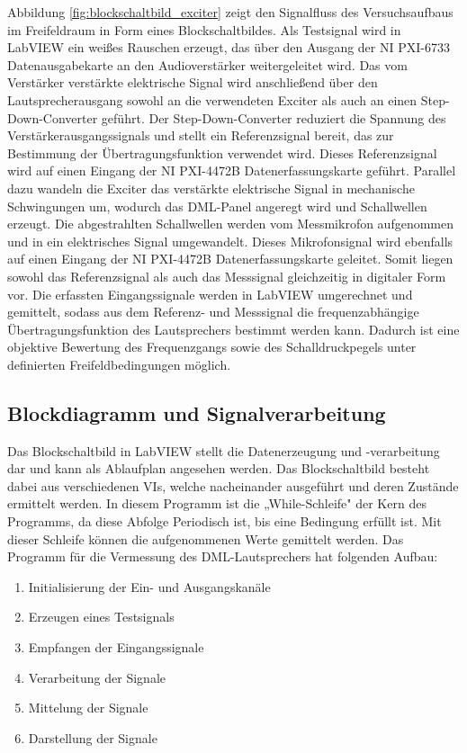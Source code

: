 Abbildung \ref{fig:blockschaltbild_exciter} zeigt den Signalfluss des Versuchsaufbaus im Freifeldraum in Form eines Blockschaltbildes. Als Testsignal wird in LabVIEW ein weißes Rauschen erzeugt, das über den Ausgang der NI PXI-6733 Datenausgabekarte an den Audioverstärker weitergeleitet wird. Das vom Verstärker verstärkte elektrische Signal wird anschließend über den Lautsprecherausgang sowohl an die verwendeten Exciter als auch an einen Step-Down-Converter geführt.
Der Step-Down-Converter reduziert die Spannung des Verstärkerausgangssignals und stellt ein Referenzsignal bereit, das zur Bestimmung der Übertragungsfunktion verwendet wird. Dieses Referenzsignal wird auf einen Eingang der NI PXI-4472B Datenerfassungskarte geführt. Parallel dazu wandeln die Exciter das verstärkte elektrische Signal in mechanische Schwingungen um, wodurch das DML-Panel angeregt wird und Schallwellen erzeugt.
Die abgestrahlten Schallwellen werden vom Messmikrofon aufgenommen und in ein elektrisches Signal umgewandelt. Dieses Mikrofonsignal wird ebenfalls auf einen Eingang der NI PXI-4472B Datenerfassungskarte geleitet. Somit liegen sowohl das Referenzsignal als auch das Messsignal gleichzeitig in digitaler Form vor.
Die erfassten Eingangssignale werden in LabVIEW umgerechnet und gemittelt, sodass aus dem Referenz- und Messsignal die frequenzabhängige Übertragungsfunktion des Lautsprechers bestimmt werden kann. Dadurch ist eine objektive Bewertung des Frequenzgangs sowie des Schalldruckpegels unter definierten Freifeldbedingungen möglich.


\subsection{Blockdiagramm und Signalverarbeitung}

Das Blockschaltbild in LabVIEW stellt die Datenerzeugung und -verarbeitung dar und kann als Ablaufplan angesehen werden. Das Blockschaltbild besteht dabei aus verschiedenen VIs, welche nacheinander ausgeführt und deren Zustände ermittelt werden. In diesem Programm ist die „While-Schleife" der Kern des Programms, da diese Abfolge Periodisch ist, bis eine Bedingung erfüllt ist. Mit dieser Schleife können die aufgenommenen Werte gemittelt werden. Das Programm für die Vermessung des DML-Lautsprechers hat folgenden Aufbau:

\begin{enumerate}
    \item Initialisierung der Ein- und Ausgangskanäle
    \item Erzeugen eines Testsignals 
    \item Empfangen der Eingangssignale
    \item Verarbeitung der Signale
    \item Mittelung der Signale
    \item Darstellung der Signale
\end{enumerate}


